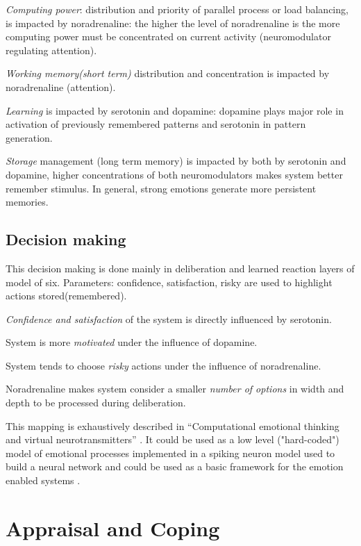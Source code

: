 \emph{Computing power}: distribution and priority of parallel process or load balancing, is impacted by noradrenaline: the higher the level of noradrenaline is the more computing power must be concentrated on current activity (neuromodulator regulating attention).

\emph{Working memory(short term)} distribution and concentration is impacted by noradrenaline (attention).

\emph{Learning} is impacted by serotonin and dopamine: dopamine plays major role in activation of previously remembered patterns and serotonin in pattern generation.

\emph{Storage} management (long term memory) is impacted by both by serotonin and dopamine, higher concentrations of both neuromodulators makes system better remember stimulus. In general, strong emotions generate more persistent memories.

\subsection{Decision making}

This decision making is done mainly in deliberation and learned reaction layers of model of six.
Parameters: confidence, satisfaction, risky are used to highlight actions stored(remembered).

\emph{Confidence and satisfaction} of the system is directly influenced by serotonin.

System is more \emph{motivated} under the influence of dopamine.

System tends to choose \emph{risky} actions under the influence of noradrenaline.

Noradrenaline makes system consider a smaller \emph{number of options} in width and depth to be processed during deliberation.

This mapping is exhaustively described in ``Computational emotional thinking and virtual neurotransmitters'' \cite{computational_emotional_thinking}. It could be used as a low level ("hard-coded") model of emotional processes implemented in a spiking neuron model used to build a neural network and could be used as a basic framework for the emotion enabled systems \cite{whatdoesitmeanforcomputer}.

\section{Appraisal and Coping}

